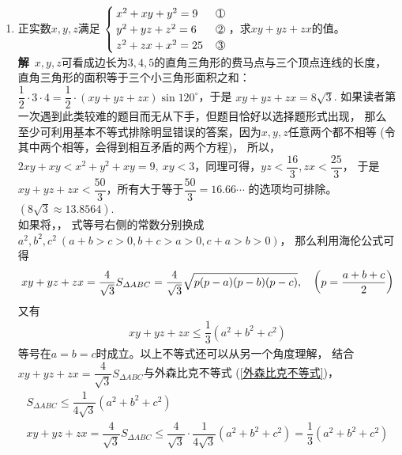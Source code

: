 \begin{enumerate}[label={【\textbf{例\thechapter.\arabic*}】},
 leftmargin=\inteval{\myenumleftmargin}pt,
 itemsep=\inteval{\myenumitempsep}pt,
 itemindent=\inteval{\myenumitemindent}pt]
% 
\item \label{三元二次非线性方程组-费马点}正实数$ x,y,z $满足
$ \begin{cases}
    x^2+xy+y^2=9  &\mycircled{1} \\
    y^2+yz+z^2=6  &\mycircled{2} \\
    z^2+zx+x^2=25 &\mycircled{3}
\end{cases} $，求$ xy+yz+zx $的值。\\
\textbf{解}\ $ x,y,z $可看成边长为$ 3,4,5 $的直角三角形的费马点与三个顶点连线的长度，
直角三角形的面积等于三个小三角形面积之和：$ \dfrac{1}{2}\cdot 3\cdot 4= \dfrac{1}{2}\cdot(xy+yz+zx)\sin 120^{\circ} $，于是
$ xy+yz+zx=8\sqrt{3} $. 如果读者第一次遇到此类较难的题目而无从下手，但题目恰好以选择题形式出现，
那么至少可利用基本不等式排除明显错误的答案，因为$ x,y,z $任意两个都不相等
(令其中两个相等，会得到相互矛盾的两个方程)，
所以，$ 2xy+xy < x^2+y^2+xy =9,\ xy <3$，同理可得，$ yz<\dfrac{16}{3},zx<\dfrac{25}{3} $，
于是$ xy+yz+zx < \dfrac{50}{3} $，所有大于等于$ \dfrac{50}{3}=16.66\cdots $
的选项均可排除。$ (8\sqrt{3}\approx 13.8564 ) $. \\
如果将，，
式等号右侧的常数分别换成$ a^2,b^2,c^2\ 
(a+b>c>0,b+c>a>0,c+a>b>0) $，
那么利用海伦公式可得
\begin{gather*}
    xy+yz+zx=
    \dfrac{4}{\sqrt{3}}S_{\Delta ABC}=
    \dfrac{4}{\sqrt{3}}\sqrt{p(p-a)(p-b)(p-c)}, \quad 
    \left(p=\dfrac{a+b+c}{2} \right)
\end{gather*}
又有
\begin{gather*}
    xy+yz+zx\leq \dfrac{1}{3}(a^2+b^2+c^2)
\end{gather*}
等号在$ a=b=c $时成立。以上不等式还可以从另一个角度理解，
结合$ xy+yz+zx=\dfrac{4}{\sqrt{3}}S_{\Delta ABC} $与外森比克不等式
(\ref{外森比克不等式})，
\begin{gather*}
    S_{\Delta ABC}\leq \dfrac{1}{4\sqrt{3}}(a^2+b^2+c^2) \\
    xy+yz+zx=\dfrac{4}{\sqrt{3}}S_{\Delta ABC}\leq 
    \dfrac{4}{\sqrt{3}}\cdot \dfrac{1}{4\sqrt{3}}(a^2+b^2+c^2)=
    \dfrac{1}{3}(a^2+b^2+c^2)
\end{gather*}


\end{enumerate}
